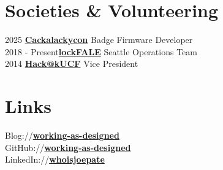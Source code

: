 \documentclass[letterpaper]{deedy-resume} %
\begin{document}
\begin{minipage}[t]{0.33\textwidth}
\sectionspace %


\section{Societies & Volunteering}
2025 \textbf{\href{https://github.com/lockfale/cackalackybadgyfirmware2025}{Cackalackycon}} Badge Firmware Developer \\
2018 - Present\textbf{\href{https://github.com/lockfale}{lockFALE}} Seattle Operations Team \\
2014 \textbf{\href{https://www.hackucf.org/}{Hack@kUCF}} Vice President \\
\sectionspace %


\section{Links}

Blog://\href{https://working-as-designed.github.io/}{\bf working-as-designed} \\
GitHub://\href{https://github.com/working-as-designed}{\bf working-as-designed} \\
LinkedIn://\href{https://linkedin.com/in/whoisjoepate/}{\bf whoisjoepate} \\

\sectionspace %


\end{minipage} %
\hfill
%
%
\end{document}
